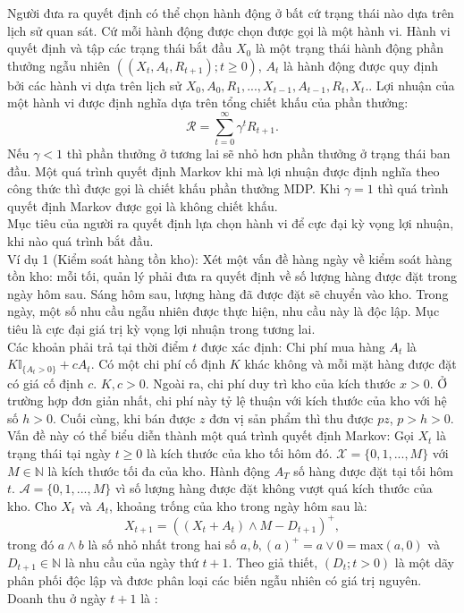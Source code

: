 \documentclass[14pt,a4paper,oneside]{report}		%
\begin{document}
Người đưa ra quyết định có thể chọn hành động ở bất cứ trạng thái nào dựa trên lịch sử quan sát. Cứ mỗi hành động được chọn được gọi là một hành vi. Hành vi quyết định và tập các trạng thái bắt đầu $X_0$ là một trạng thái hành động phần thưởng ngẫu nhiên $((X_t,A_t,R_{t+1});t\geq 0)$, $A_t$ là hành động được quy định bởi các hành vi dựa trên lịch sử $X_0,A_0,R_1,...,X_{t-1},A_{t-1},R_t,X_t.$. Lợi nhuận của một hành vi được định nghĩa dựa trên tổng chiết khấu của phần thưởng:
$$\mathcal{R}=\displaystyle\sum_{t=0}^{\infty}{\gamma^tR_{t+1}}.$$
Nếu $\gamma < 1$ thì phần thưởng ở tương lai sẽ nhỏ hơn phần thưởng ở trạng thái ban đầu. Một quá trình quyết định Markov khi mà lợi nhuận được định nghĩa theo công thức thì được gọi là chiết khấu phần thưởng MDP. Khi $\gamma =1$ thì quá trình quyết định Markov được gọi là không chiết khấu.\\
Mục tiêu của người ra quyết định lựa chọn hành vi để cực đại kỳ vọng lợi nhuận, khi nào quá trình bắt đầu.\\
Ví dụ 1 (Kiểm soát hàng tồn kho): Xét một vấn đề hàng ngày về kiểm soát hàng tồn kho: mỗi tối, quản lý phải đưa ra quyết định về số lượng hàng được đặt trong ngày hôm sau. Sáng hôm sau, lượng hàng đã được đặt sẽ chuyển vào kho. Trong ngày, một số nhu cầu ngẫu nhiên được thực hiện, nhu cầu này là độc lập. Mục tiêu là cực đại giá trị kỳ vọng lợi nhuận trong tương lai. \\
Các khoản phải trả tại thời điểm $t$ được xác định: Chi phí mua hàng $A_t$ là $K\mathbb{I}_{\{A_t>0\}} + cA_t$. Có một chi phí cố định $K$ khác không và mỗi mặt hàng được đặt có giá cố định $c$. $K, c > 0$. Ngoài ra, chi phí duy trì kho của kích thước $x > 0$. Ở trường hợp đơn giản nhất, chi phí này tỷ lệ thuận với kích thước của kho với hệ số $h>0$. Cuối cùng, khi bán được $z$ đơn vị sản phẩm thì thu được $pz$, $p>h>0$.\\
Vấn đề này có thể biểu diễn thành một quá trình quyết định Markov: Gọi $X_t$ là trạng thái tại ngày $t\geq 0$ là kích thước của kho tối hôm đó. $\mathcal{X}=\{0,1,...,M\}$ với $M\in\mathbb{N}$ là kích thước tối đa của kho. Hành động $A_T$ số hàng được đặt tại tối hôm $t$. $\mathcal{A} = \{0,1,...,M\}$ vì số lượng hàng được đặt không vượt quá kích thước của kho. Cho $X_t$ và $A_t$, khoảng trống của kho trong ngày hôm sau là:
\begin{equation} \label{eq2}
X_{t+1}=((X_t+A_t)\wedge M-D_{t+1})^+,
\end{equation}
trong đó $a\wedge b$ là số nhỏ nhất trong hai số $a, b, (a)^+=a\vee 0 =$max$(a,0)$ và $D_{t+1} \in \mathbb{N}$ là nhu cầu của ngày thứ $t+1$. Theo giả thiết, $(D_t;t>0)$ là một dãy phân phối độc lập và đươc phân loại các biến ngẫu nhiên có giá trị nguyên. Doanh thu ở ngày $t+1$ là :
\end{document}
